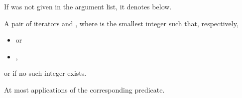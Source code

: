 \begin{itemdescr}
\pnum
\remarks If  was not given in the argument list, it denotes
 below.

\pnum
\returns
A pair of iterators  and
, where  is the smallest integer
such that, respectively,
\begin{itemize}
\item {} or
\item {},
\end{itemize}
or  if no such integer exists.

\pnum
\complexity
At most
applications of the corresponding predicate.
\end{itemdescr}

